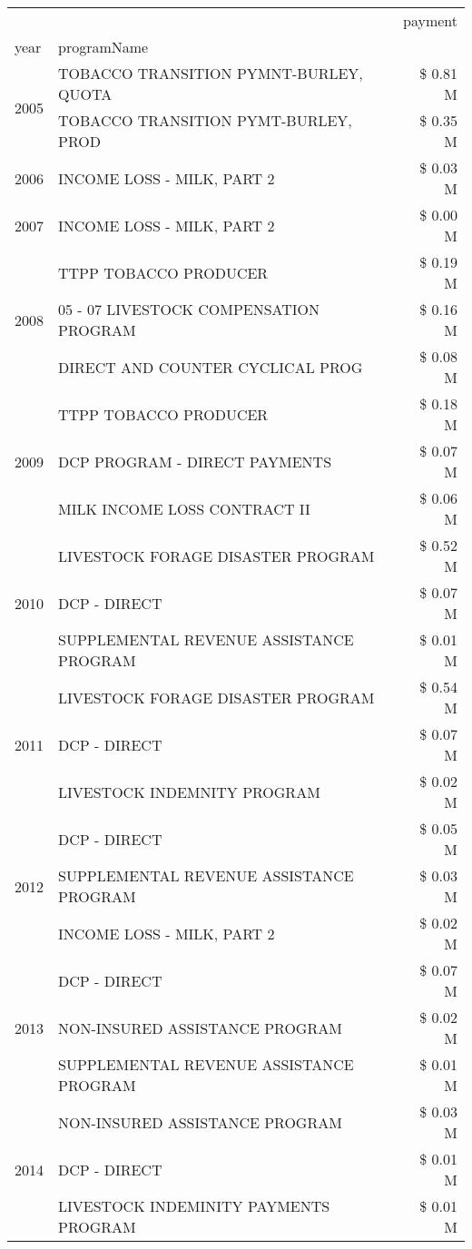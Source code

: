 \begin{tabular}{llr}
\toprule
 &  & payment \\
year & programName &  \\
\midrule
\multirow[t]{2}{*}{2005} & TOBACCO TRANSITION PYMNT-BURLEY, QUOTA & \$ 0.81 M \\
 & TOBACCO TRANSITION PYMT-BURLEY, PROD & \$ 0.35 M \\
\cline{1-3}
2006 & INCOME LOSS - MILK, PART 2 & \$ 0.03 M \\
\cline{1-3}
2007 & INCOME LOSS - MILK, PART 2 & \$ 0.00 M \\
\cline{1-3}
\multirow[t]{3}{*}{2008} & TTPP TOBACCO PRODUCER & \$ 0.19 M \\
 & 05 - 07 LIVESTOCK COMPENSATION PROGRAM & \$ 0.16 M \\
 & DIRECT AND COUNTER CYCLICAL PROG & \$ 0.08 M \\
\cline{1-3}
\multirow[t]{3}{*}{2009} & TTPP TOBACCO PRODUCER & \$ 0.18 M \\
 & DCP PROGRAM - DIRECT PAYMENTS & \$ 0.07 M \\
 & MILK INCOME LOSS CONTRACT II & \$ 0.06 M \\
\cline{1-3}
\multirow[t]{3}{*}{2010} & LIVESTOCK FORAGE DISASTER PROGRAM & \$ 0.52 M \\
 & DCP - DIRECT & \$ 0.07 M \\
 & SUPPLEMENTAL REVENUE ASSISTANCE PROGRAM & \$ 0.01 M \\
\cline{1-3}
\multirow[t]{3}{*}{2011} & LIVESTOCK FORAGE DISASTER PROGRAM & \$ 0.54 M \\
 & DCP - DIRECT & \$ 0.07 M \\
 & LIVESTOCK INDEMNITY PROGRAM & \$ 0.02 M \\
\cline{1-3}
\multirow[t]{3}{*}{2012} & DCP - DIRECT & \$ 0.05 M \\
 & SUPPLEMENTAL REVENUE ASSISTANCE PROGRAM & \$ 0.03 M \\
 & INCOME LOSS - MILK, PART 2 & \$ 0.02 M \\
\cline{1-3}
\multirow[t]{3}{*}{2013} & DCP - DIRECT & \$ 0.07 M \\
 & NON-INSURED ASSISTANCE PROGRAM & \$ 0.02 M \\
 & SUPPLEMENTAL REVENUE ASSISTANCE PROGRAM & \$ 0.01 M \\
\cline{1-3}
\multirow[t]{3}{*}{2014} & NON-INSURED ASSISTANCE PROGRAM & \$ 0.03 M \\
 & DCP - DIRECT & \$ 0.01 M \\
 & LIVESTOCK INDEMINITY PAYMENTS PROGRAM & \$ 0.01 M \\

\end{tabular}
